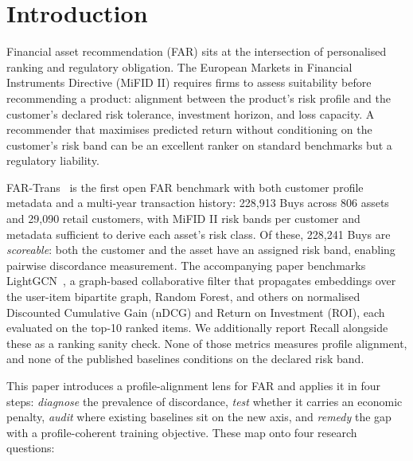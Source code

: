 \section{Introduction}
\label{sec:intro}

Financial asset recommendation (FAR) sits at the intersection of personalised ranking and regulatory obligation. The European Markets in Financial Instruments Directive (MiFID II) requires firms to assess suitability before recommending a product: alignment between the product's risk profile and the customer's declared risk tolerance, investment horizon, and loss capacity. A recommender that maximises predicted return without conditioning on the customer's risk band can be an excellent ranker on standard benchmarks but a regulatory liability.

FAR-Trans~\cite{sanzcruzado2024fartransinvestmentdatasetfinancial} is the first open FAR benchmark with both customer profile metadata and a multi-year transaction history: 228{,}913 Buys across 806 assets and 29{,}090 retail customers, with MiFID II risk bands per customer and metadata sufficient to derive each asset's risk class. Of these, 228{,}241 Buys are \emph{scoreable}: both the customer and the asset have an assigned risk band, enabling pairwise discordance measurement. The accompanying paper benchmarks LightGCN~\cite{he2020lightgcnsimplifyingpoweringgraph}, a graph-based collaborative filter that propagates embeddings over the user-item bipartite graph, Random Forest, and others on normalised Discounted Cumulative Gain (nDCG) and Return on Investment (ROI), each evaluated on the top-10 ranked items. We additionally report Recall alongside these as a ranking sanity check. None of those metrics measures profile alignment, and none of the published baselines conditions on the declared risk band.

This paper introduces a profile-alignment lens for FAR and applies it in four steps: \emph{diagnose} the prevalence of discordance, \emph{test} whether it carries an economic penalty, \emph{audit} where existing baselines sit on the new axis, and \emph{remedy} the gap with a profile-coherent training objective. These map onto four research questions:

